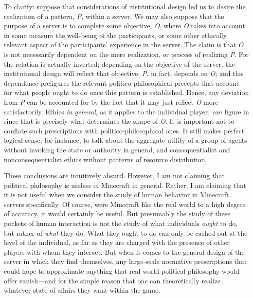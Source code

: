 To clarify: suppose that considerations of institutional design led us to desire the realization of a pattern, \emph{P}, within a server. We may also suppose that the purpose of a server is to complete some objective, \emph{O}, where \emph{O} takes into account in some measure the well-being of the participants, or some other ethically relevant aspect of the participants’ experience in the server. The claim is that \emph{O} is not necessarily dependent on the mere realization, or process of realizing \emph{P}. For the relation is actually inverted; depending on the objective of the server, the institutional design will reflect that objective. \emph{P}, in fact, depends on \emph{O}; and this dependence prefigures the relevant politico-philosophical precepts that account for what people ought to do once this pattern is established. Hence, any deviation from \emph{P} can be accounted for by the fact that it may just reflect \emph{O} more satisfactorily. Ethics \emph{in general}, as it applies to the individual player, \emph{can} figure in since that is precisely what determines the shape of \emph{O}. It is important not to conflate such prescriptions with politico-philosophical ones. It still makes perfect logical sense, for instance, to talk about the aggregate utility of a group of agents without invoking the state or authority in general, and consequentialist and nonconsequentialist ethics without patterns of resource distribution.

These conclusions are intuitively absurd. However, I am not claiming that political philosophy is useless in Minecraft in general. Rather, I am claiming that it is not useful when we consider the study of human behavior in Minecraft servers specifically. Of course, were Minecraft like the real world to a high degree of accuracy, it would certainly be useful. But presumably the study of these pockets of human interaction is not the study of what individuals \emph{ought} to do, but rather of \emph{what} they do. What they ought to do can only be cashed out at the level of the individual, as far as they are charged with the presence of other players with whom they interact. But when it comes to the general design of the server in which they find themselves, any large-scale normative prescriptions that could hope to approximate anything that real-world political philosophy would offer vanish---and for the simple reason that one can theoretically realize whatever state of affairs they want within the game.

